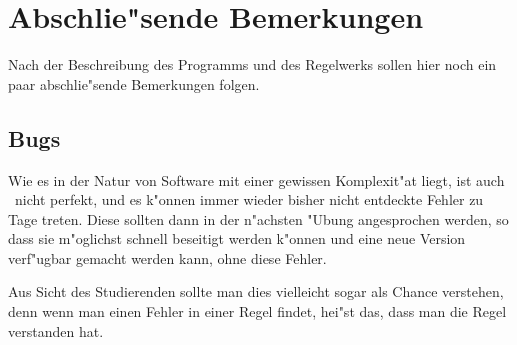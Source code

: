 
\chapter{Abschlie"sende Bemerkungen}

Nach der Beschreibung des Programms und des Regelwerks sollen hier noch ein paar abschlie"sende
Bemerkungen folgen.



\section{Bugs}

Wie es in der Natur von Software mit einer gewissen Komplexit"at liegt, ist auch \TPML\ nicht
perfekt, und es k"onnen immer wieder bisher nicht entdeckte Fehler zu Tage treten. Diese sollten
dann in der n"achsten "Ubung angesprochen werden, so dass sie m"oglichst schnell beseitigt
werden k"onnen und eine neue Version verf"ugbar gemacht werden kann, ohne diese Fehler.

Aus Sicht des Studierenden sollte man dies vielleicht sogar als Chance verstehen, denn wenn
man einen Fehler in einer Regel findet, hei"st das, dass man die Regel verstanden
hat.



